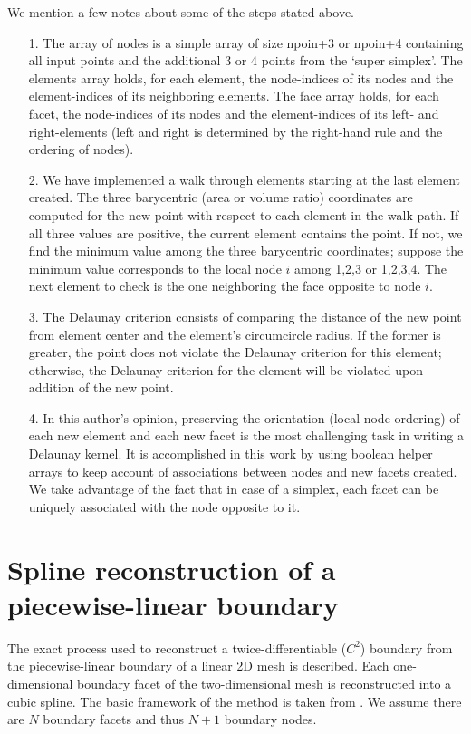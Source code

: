 We mention a few notes about some of the steps stated above.
\begin{enumerate}
	\item[1.] The array of nodes is a simple array of size npoin+3 or npoin+4 containing all input points and the additional 3 or 4 points from the `super simplex'. The elements array holds, for each element, the node-indices of its nodes and the element-indices of its neighboring elements. The face array holds, for each facet, the node-indices of its nodes and the element-indices of its left- and right-elements (left and right is determined by the right-hand rule and the ordering of nodes).
	\item[2.] We have implemented a walk through elements starting at the last element created. The three barycentric (area or volume ratio) coordinates are computed for the new point with respect to each element in the walk path. If all three values are positive, the current element contains the point. If not, we find the minimum value among the three barycentric coordinates; suppose the minimum value corresponds to the local node $i$ among 1,2,3 or 1,2,3,4. The next element to check is the one neighboring the face opposite to node $i$.
	\item[3.] The Delaunay criterion consists of comparing the distance of the new point from element center and the element's circumcircle radius. If the former is greater, the point does not violate the Delaunay criterion for this element; otherwise, the Delaunay criterion for the element will be violated upon addition of the new point.
	\item[4.] In this author's opinion, preserving the orientation (local node-ordering) of each new element and each new facet is the most challenging task in writing a Delaunay kernel. It is accomplished in this work by using boolean helper arrays to keep account of associations between nodes and new facets created. We take advantage of the fact that in case of a simplex, each facet can be uniquely associated with the node opposite to it.
\end{enumerate}

\chapter[Spline reconstruction]{Spline reconstruction of a piecewise-linear boundary}
\label{app:spline}

The exact process used to reconstruct a twice-differentiable ($C^2$) boundary from the piecewise-linear boundary of a linear 2D mesh is described. Each one-dimensional boundary facet of the two-dimensional mesh is reconstructed into a cubic spline. The basic framework of the method is taken from \cite{sr:wolframspline}. We assume there are $N$ boundary facets and thus $N+1$ boundary nodes.

